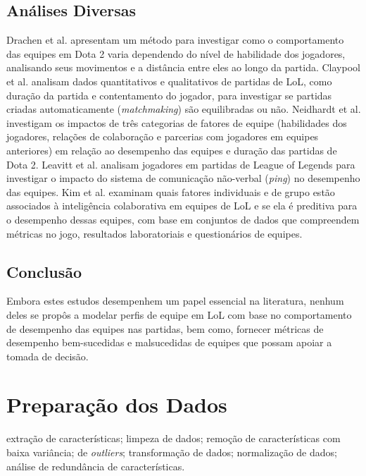\section{Análises Diversas}
Drachen et al. \cite{drachen2014skill} apresentam um método para investigar como o comportamento das equipes em Dota 2 varia dependendo do nível de habilidade dos jogadores, analisando seus movimentos e a distância entre eles ao longo da partida. Claypool et al. \cite{claypool2015surrender} analisam dados quantitativos e qualitativos de partidas de LoL, como duração da partida e contentamento do jogador, para investigar se partidas criadas automaticamente (\textit{matchmaking}) são equilibradas ou não. Neidhardt et al. \cite{neidhardt2015team} investigam os impactos de três categorias de fatores de equipe (habilidades dos jogadores, relações de colaboração e parcerias com jogadores em equipes anteriores) em relação ao desempenho das equipes e duração das partidas de Dota 2. Leavitt et al. \cite{leavitt2016ping} analisam jogadores em partidas de League of Legends para investigar o impacto do sistema de comunicação não-verbal (\textit{ping}) no desempenho das equipes. Kim et al. \cite{kim2017makes} examinam quais fatores individuais e de grupo estão associados à inteligência colaborativa em equipes de LoL e se ela é preditiva para o desempenho dessas equipes, com base em conjuntos de dados que compreendem métricas no jogo, resultados laboratoriais e questionários de equipes.

\section{Conclusão}
Embora estes estudos desempenhem um papel essencial na literatura, nenhum deles se propôs a modelar perfis de equipe em LoL com base no comportamento de desempenho das equipes nas partidas, bem como, fornecer métricas de desempenho bem-sucedidas e malsucedidas de equipes que possam apoiar a tomada de decisão.

\chapter{Preparação dos Dados}
 extração de características; limpeza de dados; remoção de características com baixa variância;  de \textit{outliers}; transformação de dados; normalização de dados; análise de redundância de características.

